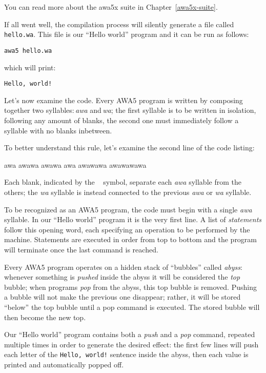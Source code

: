 \documentclass[11pt,a4paper,draft]{book}
\begin{document}
You can read more about the awa5x suite in Chapter~\ref{awa5x-suite}.

If all went well, the compilation process will silently generate a
file called \verb|hello.wa|. This file is our \enquote{Hello world}
program and it can be run as follows:
\begin{verbatim}
awa5 hello.wa
\end{verbatim}

which will print:
\begin{verbatim}
Hello, world!
\end{verbatim}

\label{awa-bits}
Let's now examine the code. Every AWA5 program is written by composing
together two syllables:\,\emph{awa} and\,\emph{wa}; the first syllable
is to be written in isolation, following any amount of blanks, the
second one must immediately follow a syllable with no blanks
inbetween.

To better understand this rule, let's examine the second line of the
code listing:
\begin{verbatim*}
awa awawa awawa awa awawawa awawawawa
\end{verbatim*}

Each blank, indicated by the \verb*| | symbol,
separate each \emph{awa} syllable from the others;
the \emph{wa} syllable is instead connected to the
previous \emph{awa} or \emph{wa} syllable.

To be recognized as an AWA5 program, the code must begin with a single
\emph{awa} syllable. In our \enquote{Hello world} program it is the
very first line. A list of \emph{statements} follow this opening word,
each specifying an operation to be performed by the
machine. Statements are executed in order from top to bottom and the
program will terminate once the last command is reached.

Every AWA5 program operates on a hidden stack of \enquote{bubbles}
called \emph{abyss}: whenever something is \emph{pushed} inside the
abyss it will be considered the \emph{top} bubble; when programs
\emph{pop} from the abyss, this top bubble is removed. Pushing a
bubble will not make the previous one disappear; rather, it will be
stored \enquote{below} the top bubble until a pop command is
executed. The stored bubble will then become the new top.

Our \enquote{Hello world} program contains both a \emph{push} and a
\emph{pop} command, repeated multiple times in order to generate the
desired effect: the first few lines will push each letter of the
\verb|Hello, world!| sentence inside the abyss, then each value is
printed and automatically popped off.
\end{document}
